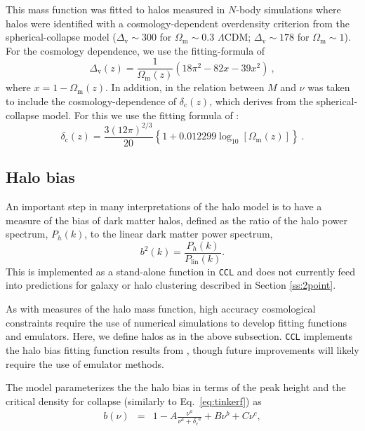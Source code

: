 \documentclass[\docopts]{\docclass}
\newcommand{\ccl}{{\tt CCL}\xspace}
\begin{document}
This mass function was fitted to halos measured in $N$-body simulations where halos were identified with a cosmology-dependent overdensity criterion from the spherical-collapse model ($\Delta_\mathrm{v}\sim 300$ for $\Omega_\mathrm{m}\sim 0.3$ $\Lambda$CDM; $\Delta_\mathrm{v}\sim 178$ for $\Omega_\mathrm{m}\sim 1$). For the cosmology dependence, we use the fitting-formula of \cite{Bryan1998}
\begin{equation}
\Delta_\mathrm{v}(z)=\frac{1}{\Omega_\mathrm{m}(z)}\left(18\pi^2-82x-39x^2\right)\ ,
\label{eq:Deltav_Bryan}
\end{equation}
where $x=1-\Omega_\mathrm{m}(z)$. In addition, in \cite{Sheth1999} the relation between $M$ and $\nu$ was taken to include the cosmology-dependence of $\delta_\mathrm{c}(z)$, which derives from the spherical-collapse model. For this we use the fitting formula of \cite{Nakamura1997}:
\begin{equation}
\delta_\mathrm{c}(z)=\frac{3(12\pi)^{2/3}}{20}\left\{1+0.012299\log_{10}[\Omega_\mathrm{m}(z)]\right\}\ .
\label{eq:deltac_Nakamura}
\end{equation}

\subsection{Halo bias}
\label{sec:hbdef}

An important step in many interpretations of the halo model is to have a measure of the bias of dark matter halos, defined as the ratio of the halo power spectrum, $P_h(k)$, to the linear dark matter power spectrum,
\begin{equation}
  b^2(k) = \frac{P_h(k)}{P_{\mathrm{lin}}(k)}.
  \label{eq:halo_bias}
\end{equation}
This is implemented as a stand-alone function in \ccl and does not currently feed into predictions for galaxy or halo clustering described in Section \ref{ss:2point}.

As with measures of the halo mass function, high accuracy cosmological constraints require the use of numerical simulations to develop fitting functions and emulators. Here, we define halos as in the above subsection. {\tt CCL} implements the halo bias fitting function results from \citet{Tinker2010}, though future improvements will likely require the use of emulator methods.

The \citet{Tinker2010} model parameterizes the the halo bias in terms of the peak height and the critical density for collapse (similarly to Eq.~\ref{eq:tinkerf}) as
\begin{eqnarray}
  b(\nu) &=& 1 - A\frac{\nu^a}{\nu^a + {\delta_c}^a} + B\nu^b+C\nu^c,\\
\end{eqnarray}
\end{document}
